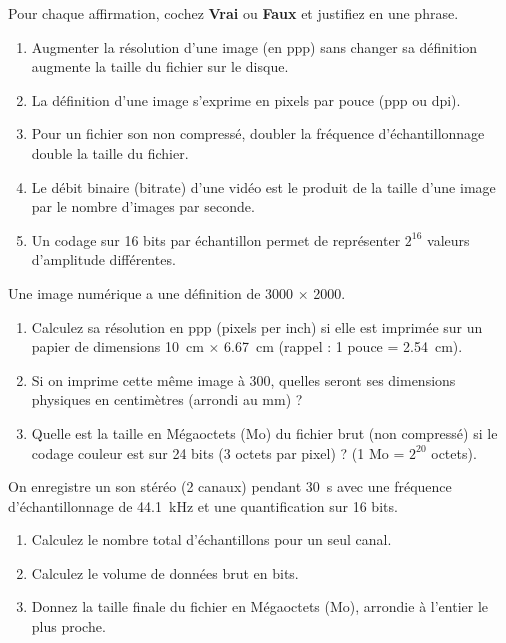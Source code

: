 \documentclass[11pt]{article}
\begin{document}
\begin{exercice}
Pour chaque affirmation, cochez \textbf{Vrai} ou \textbf{Faux} et justifiez en une phrase.
\begin{enumerate}
    \item Augmenter la résolution d'une image (en ppp) sans changer sa définition augmente la taille du fichier sur le disque. \hfill {} \quad {}
    \item La définition d'une image s'exprime en pixels par pouce (ppp ou dpi). \hfill {} \quad {}
    \item Pour un fichier son non compressé, doubler la fréquence d'échantillonnage double la taille du fichier. \hfill {} \quad {}
    \item Le débit binaire (bitrate) d'une vidéo est le produit de la taille d'une image par le nombre d'images par seconde. \hfill {} \quad {}
    \item Un codage sur 16 bits par échantillon permet de représenter $2^{16}$ valeurs d'amplitude différentes. \hfill {} \quad {}
\end{enumerate}
\end{exercice}

\begin{exercice}
Une image numérique a une définition de \SI{3000}{} $\times$ \SI{2000}{}.
\begin{enumerate}
    \item Calculez sa résolution en ppp (pixels per inch) si elle est imprimée sur un papier de dimensions \SI{10}{\centi\metre} $\times$ \SI{6,67}{\centi\metre} (rappel : 1 pouce = \SI{2,54}{\centi\metre}).
    \item Si on imprime cette même image à \SI{300}{}, quelles seront ses dimensions physiques en centimètres (arrondi au mm) ?
    \item Quelle est la taille en Mégaoctets (Mo) du fichier brut (non compressé) si le codage couleur est sur 24 bits (3 octets par pixel) ? (1 Mo = $2^{20}$ octets).
\end{enumerate}
\end{exercice}

\begin{exercice}
On enregistre un son stéréo (2 canaux) pendant \SI{30}{\second} avec une fréquence d'échantillonnage de \SI{44,1}{\kilo\hertz} et une quantification sur 16 bits.
\begin{enumerate}
    \item Calculez le nombre total d'échantillons pour un seul canal.
    \item Calculez le volume de données brut en bits.
    \item Donnez la taille finale du fichier en Mégaoctets (Mo), arrondie à l'entier le plus proche.
\end{enumerate}
\end{exercice}
\end{document}

